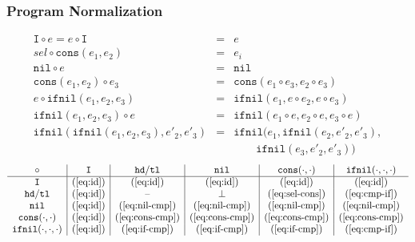 \documentclass{beamer}
\begin{document}
\begin{frame}
  \frametitle{Program Normalization}
  \begin{eqnarray}
  \texttt{I} \circ e = e \circ \texttt{I} & = & e \label{eq:id} \\
  \mathit{sel} \circ \texttt{cons}(e_1, e_2) & = & e_i \label{eq:sel-cons} \\
  \texttt{nil} \circ e & = & \texttt{nil} \label{eq:nil-cmp} \\
  \texttt{cons}(e_1, e_2) \circ e_3 & = & \texttt{cons}(e_1 \circ e_3, e_2 \circ e_3) \label{eq:cons-cmp} \\
  e \circ \texttt{ifnil}(e_1, e_2, e_3) & = & \texttt{ifnil}(e_1, e \circ e_2, e \circ e_3) \label{eq:cmp-if} \\
  \texttt{ifnil}(e_1, e_2, e_3) \circ e & = & \texttt{ifnil}(e_1 \circ e, e_2 \circ e, e_3 \circ e) \label{eq:if-cmp} \\
  \texttt{ifnil}(\texttt{ifnil}(e_1, e_2, e_3), e'_2, e'_3) & = & \texttt{ifnil}(e_1, \texttt{ifnil}(e_2, e'_2, e'_3), \nonumber \\
    & & \qquad \texttt{ifnil}(e_3, e'_2, e'_3)) \label{eq:if-if}
  \end{eqnarray}
  {\small 
  \[
  \begin{array}{c|c|c|c|c|c}
  \circ              & \texttt{I} & \texttt{hd}/ \texttt{tl} & \texttt{nil} & \texttt{cons}(\cdot, \cdot) & \texttt{ifnil}(\cdot, \cdot, \cdot) \\
  \hline
  \texttt{I}                          & (\ref{eq:id}) & (\ref{eq:id})      & (\ref{eq:id})      & (\ref{eq:id})       & (\ref{eq:id})      \\
  \texttt{hd}/ \texttt{tl}            & (\ref{eq:id}) & \text{--}          & \perp              & (\ref{eq:sel-cons}) & (\ref{eq:cmp-if})  \\
  \texttt{nil}                        & (\ref{eq:id}) & (\ref{eq:nil-cmp}) & (\ref{eq:nil-cmp}) & (\ref{eq:nil-cmp})  & (\ref{eq:nil-cmp}) \\
  \texttt{cons}(\cdot, \cdot)         & (\ref{eq:id}) & (\ref{eq:cons-cmp})& (\ref{eq:cons-cmp})& (\ref{eq:cons-cmp}) & (\ref{eq:cons-cmp})\\
  \texttt{ifnil}(\cdot, \cdot, \cdot) & (\ref{eq:id}) & (\ref{eq:if-cmp})  & (\ref{eq:if-cmp})  & (\ref{eq:if-cmp})   & (\ref{eq:cmp-if}) 
  \end{array}
  \]
  }
\end{frame}
\end{document}
